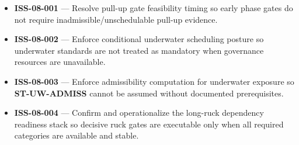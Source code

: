 \documentclass[10pt]{article}
\begin{document}
\begin{itemize}
\item \textbf{ISS-08-001} — Resolve pull-up gate feasibility timing so early phase gates do not require inadmissible/unschedulable pull-up evidence.
\item \textbf{ISS-08-002} — Enforce conditional underwater scheduling posture so underwater standards are not treated as mandatory when governance resources are unavailable.
\item \textbf{ISS-08-003} — Enforce admissibility computation for underwater exposure so \textbf{ST-UW-ADMISS} cannot be assumed without documented prerequisites.
\item \textbf{ISS-08-004} — Confirm and operationalize the long-ruck dependency readiness stack so decisive ruck gates are executable only when all required categories are available and stable.
\end{itemize}
\end{document}
